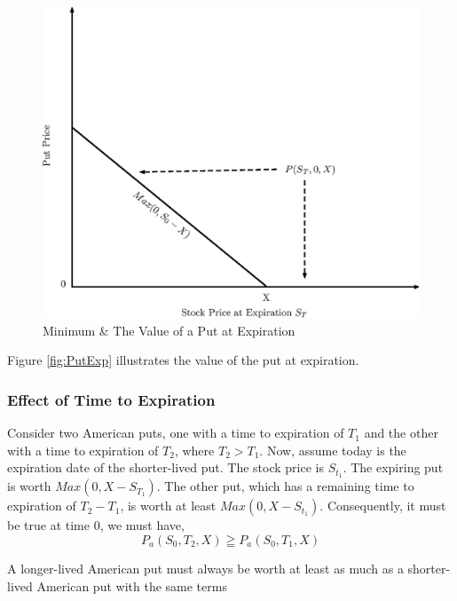 \documentclass{book}
\theoremstyle{definition}
\theoremstyle{remark}
\begin{document}
                \begin{figure}[h]
                    \centering
                        \includegraphics[scale=0.45]{images/fig:PutExp.eps}
                    \caption{Minimum \& The Value of a Put at Expiration}
                    \label{fig:PutExp   }                
                \end{figure} 
            
            Figure \ref{fig:PutExp} illustrates the value of the put at expiration.
            
        \subsubsection{Effect of Time to Expiration}
        
            Consider two American puts, one with a time to expiration of $T_1$ and the other with a time to expiration of $T_2$, where $T_2 > T_1$. Now, assume today is the expiration date of the shorter-lived put. The stock price is $S_{t_1}$. The expiring put is worth $Max (0, X - S_{T_1})$. The other put, which has a remaining time to expiration of $T_2 - T_1$, is worth at least $Max(0, X - S_{t_1})$. Consequently, it must be true at time $0$, we must have, 
                \begin{equation}
                    P_a(S_0, T_2, X) \geqq P_a (S_0, T_1, X)
                \end{equation}
                
        \begin{tcolorbox}[colback=blue!5!white,colframe=blue!75!black, title=Sticky Note]
            A longer-lived American put must always be worth at least as much as a shorter-lived American put with the same terms 
        \end{tcolorbox}                  
                
\end{document}

